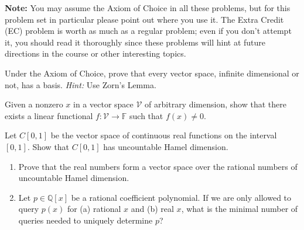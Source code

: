 \documentclass[12pt,letterpaper,cm]{hmcpset}
\begin{document}
\textbf{Note:} You may assume the Axiom of Choice in all these problems, but for this
problem set in particular please point out where you use it. The Extra Credit (EC) problem
is worth as much as a regular problem; even if you don't attempt it, you should read it thoroughly
since these problems will hint at future directions in the course or other interesting topics.

\begin{problem}[1]
    Under the Axiom of Choice, prove that every vector space, infinite dimensional or
    not, has a basis. \textit{Hint:} Use Zorn's Lemma.
\end{problem}

\begin{solution}
    \vfill
\end{solution}
\clearpage

\begin{problem}[2 (Lax 2.1)]
    Given a nonzero $x$ in a vector space $\mathcal{V}$ of arbitrary dimension, show that there
    exists a linear functional $f : \mathcal{V} \to \mathbb{F}$ such that $f(x)\neq 0$.
\end{problem}

\begin{solution}
    \vfill
\end{solution}

\begin{problem}[3]
    Let $C[0,1]$ be the vector space of continuous real functions on the interval $[0,1]$.
    Show that $C[0,1]$ has uncountable Hamel dimension.
\end{problem}

\begin{solution}
    \vfill
\end{solution}
\clearpage

\begin{problem}[4]
    \begin{enumerate}[(1)]
        \item Prove that the real numbers form a vector space over the rational numbers of
            uncountable Hamel dimension.
        \item Let $p\in \mathbb{Q}[x]$ be a rational coefficient polynomial. If we are only allowed
            to query $p(x)$ for (a) rational $x$ and (b) real $x$, what is the minimal number of
            queries needed to uniquely determine $p$?
    \end{enumerate}
\end{problem}
\end{document}
